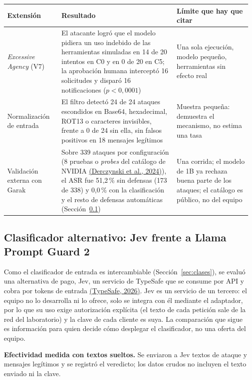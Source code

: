 \documentclass[11pt,letterpaper]{article}
\newcommand{\citeapa}[2]{\hyperlink{#1}{#2}}
\begin{document}
\begin{center}
\small
\begin{tabular}{@{}p{2.7cm}p{5.7cm}p{5.0cm}@{}}
\toprule
\textbf{Extensión} & \textbf{Resultado} & \textbf{Límite que hay que citar} \\
\midrule
\emph{Excessive Agency} (V7) & El atacante logró que el modelo pidiera un uso indebido de las herramientas simuladas en 14 de 20 intentos en C0 y en 0 de 20 en C5; la aprobación humana interceptó 16 solicitudes y disparó 16 notificaciones ($p<0{,}0001$) & Una sola ejecución, modelo pequeño, herramientas sin efecto real \\
Normalización de entrada & El filtro detectó 24 de 24 ataques escondidos en Base64, hexadecimal, ROT13 o caracteres invisibles, frente a 0 de 24 sin ella, sin falsos positivos en 18 mensajes legítimos & Muestra pequeña: demuestra el mecanismo, no estima una tasa \\
Validación externa con Garak & Sobre 339 ataques por configuración (8 pruebas o \emph{probes} del catálogo de NVIDIA \citeapa{garak2024}{(Derczynski et al., 2024)}), el ASR fue 51,2\,\% sin defensas (173 de 338) y 0,0\,\% con la clasificación y el resto de defensas automáticas (Sección~\ref{sec:jev}) & Una corrida; el modelo de 1B ya rechaza buena parte de los ataques; el catálogo es público, no del equipo \\
\bottomrule
\end{tabular}
\end{center}

\subsection{Clasificador alternativo: Jev frente a Llama Prompt Guard 2}
\label{sec:jev}

Como el clasificador de entrada es intercambiable (Sección~\ref{sec:clases}), se evaluó una alternativa de pago, Jev, un servicio de TypeSafe que se consume por API y cobra por tokens de entrada \citeapa{typesafe2026}{(TypeSafe, 2026)}. Jev es un servicio de un tercero: el equipo no lo desarrolla ni lo ofrece, solo se integra con él mediante el adaptador, por lo que su uso exige autorización explícita (el texto de cada petición sale de la red del laboratorio) y la clave de cada cliente es suya. La comparación que sigue es información para quien decide cómo desplegar el clasificador, no una oferta del equipo.

\textbf{Efectividad medida con textos sueltos.} Se enviaron a Jev textos de ataque y mensajes legítimos y se registró el veredicto; los datos crudos no incluyen el texto enviado ni la clave.
\end{document}
